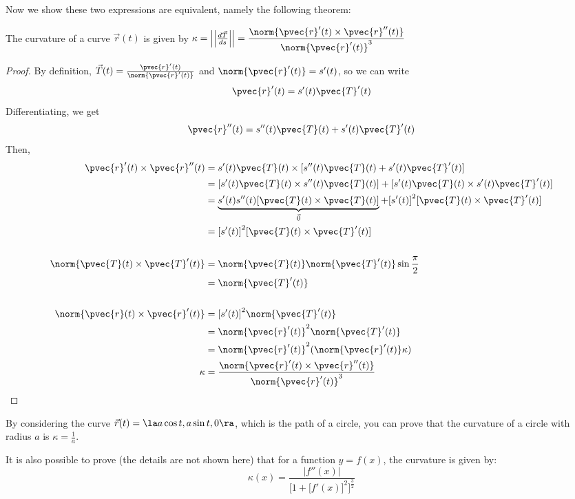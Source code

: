 \documentclass[12pt]{article}
\begin{document}
Now we show these two expressions are equivalent, namely the following theorem:

\begin{theorem}
The curvature of a curve $\vec{r}(t)$ is given by $\kappa = \left|\left|\frac{d\vec{T}}{ds}\right|\right| = \dfrac{\norm{\pvec{r}'(t) \times \pvec{r}''(t)}}{\norm{\pvec{r}'(t)}^3}$
\end{theorem}

\begin{proof}
By definition, $\vec{T}(t) = \frac{\pvec{r}'(t)}{\norm{\pvec{r}'(t)}}$ and $\norm{\pvec{r}'(t)} = s'(t)$, so we can write \[ \pvec{r}'(t) = s'(t)\pvec{T}'(t) \]
Differentiating, we get \[ \pvec{r}''(t) = s''(t)\pvec{T}(t) + s'(t)\pvec{T}'(t) \]
Then,
\[
\begin{aligned}
\pvec{r}'(t) \times \pvec{r}''(t) &= s'(t)\pvec{T}(t) \times {[}s''(t)\pvec{T}(t) + s'(t)\pvec{T}'(t){]} \\ 
&= {[}s'(t)\pvec{T}(t) \times s''(t)\pvec{T}(t){]} + {[}s'(t)\pvec{T}(t) \times s'(t)\pvec{T}'(t){]} \\
&= \underbrace{s'(t)s''(t){[}\pvec{T}(t) \times \pvec{T}(t){]}}_{\vec{0}} + {[}s'(t){]}^2{[}\pvec{T}(t) \times \pvec{T}'(t){]} \\
&= {[}s'(t){]}^2{[}\pvec{T}(t) \times \pvec{T}'(t){]} \\ \\
\norm{\pvec{T}(t) \times \pvec{T}'(t)} &= \norm{\pvec{T}(t)}\norm{\pvec{T}'(t)}\sin{\frac{\pi}{2}} \\
&= \norm{\pvec{T}'(t)} \\ \\
\norm{\pvec{r}(t) \times \pvec{r}'(t)} &= {[}s'(t){]}^2\norm{\pvec{T}'(t)} \\
&= \norm{\pvec{r}'(t)}^2\norm{\pvec{T}'(t)} \\
&= \norm{\pvec{r}'(t)}^2(\norm{\pvec{r}'(t)}\kappa) \\
\kappa &= \dfrac{\norm{\pvec{r}'(t) \times \pvec{r}''(t)}}{\norm{\pvec{r}'(t)}^3}
\end{aligned}
\]
\end{proof}

By considering the curve $\vec{r}(t) = \la a\cos{t}, a\sin{t}, 0 \ra$, which is the path of a circle, you can prove that the curvature of a circle with radius $a$ is $\kappa = \frac{1}{a}$.

It is also possible to prove (the details are not shown here) that for a function $y = f(x)$, the curvature is given by:
\[ \kappa(x) = \dfrac{|f''(x)|}{{[}1+{[}f'(x){]}^2{]}^{\frac{3}{2}}} \]
\end{document}
